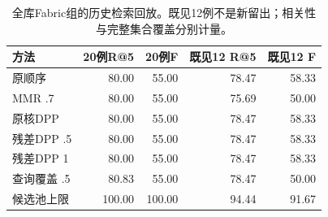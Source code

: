 \begin{table}[t]
\caption{全库Fabric组的历史检索回放。既见12例不是新留出；相关性与完整集合覆盖分别计量。}\label{tab:routing}
\centering\small
\begin{tabularx}{\textwidth}{Xrrrr}
\toprule
方法 & 20例R@5 & 20例F & 既见12 R@5 & 既见12 F \\
\midrule
原顺序 & 80.00 & 55.00 & 78.47 & 58.33 \\
MMR .7 & 80.00 & 55.00 & 75.69 & 50.00 \\
原核DPP & 80.00 & 55.00 & 78.47 & 58.33 \\
残差DPP .5 & 80.00 & 55.00 & 78.47 & 58.33 \\
残差DPP 1 & 80.00 & 55.00 & 78.47 & 58.33 \\
查询覆盖 .5 & 80.83 & 55.00 & 78.47 & 50.00 \\
候选池上限 & 100.00 & 100.00 & 94.44 & 91.67 \\
\bottomrule
\end{tabularx}
\par\vspace{2pt}{\footnotesize R@5与F单位均为百分比；候选池上限使用参考标签作事后上界，不是实际选择器。}
\end{table}
